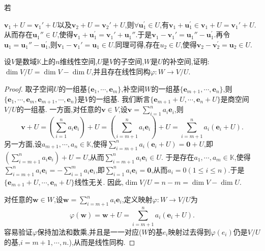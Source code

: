 \documentclass[../../main.tex]{subfiles}%
\begin{document}
\begin{remark}
\hypertarget{remark1陪集}{若}\(\boldsymbol{v}_1 + U=\boldsymbol{v}_1'+U\)以及\(\boldsymbol{v}_2 + U=\boldsymbol{v}_2'+U\),则$\forall \boldsymbol{u}_{1}^{\prime}\in U$,有$\boldsymbol{v}_1+\boldsymbol{u}_{1}^{\prime}\in \boldsymbol{v}_1 + U = \boldsymbol{v}_1' + U$.从而存在$\boldsymbol{u}_{1}''\in U$,使得$\boldsymbol{v}_1+\boldsymbol{u}_{1}^{\prime}=\boldsymbol{v}_1'+\boldsymbol{u}_{1}''$.于是$\boldsymbol{v}_1 - \boldsymbol{v}_1'=\boldsymbol{u}_{1}''-\boldsymbol{u}_{1}^{\prime}$.再令$\boldsymbol{u}_1=\boldsymbol{u}_{1}''-\boldsymbol{u}_{1}^{\prime}$,则$\boldsymbol{v}_1 - \boldsymbol{v}_1'=\boldsymbol{u}_1\in U$.同理可得,存在$u_2\in U$,使得$\boldsymbol{v}_2-\boldsymbol{v}_{2}^{\prime}=\boldsymbol{u}_2\in U$.
\end{remark}


\begin{proposition}[商空间的维数公式和商空间与补空间同构]\label{proposition:商空间的维数公式和商空间与补空间同构}
设\(V\)是数域\(\mathbb{K}\)上的\(n\)维线性空间,\(U\)是\(V\)的子空间,\(W\)是\(U\)的补空间,证明:\(\dim V/U=\dim V-\dim U\),并且存在线性同构\(\varphi:W\to V/U\).
\end{proposition}
\begin{proof}

取子空间\(U\)的一组基\(\{\boldsymbol{e}_1,\cdots,\boldsymbol{e}_m\}\),补空间\(W\)的一组基\(\{\boldsymbol{e}_{m + 1},\cdots,\boldsymbol{e}_n\}\),则\(\{\boldsymbol{e}_1,\cdots,\boldsymbol{e}_m,\boldsymbol{e}_{m + 1},\cdots,\boldsymbol{e}_n\}\)是\(V\)的一组基. 我们断言\(\{\boldsymbol{e}_{m + 1}+U,\cdots,\boldsymbol{e}_n+U\}\)是商空间\(V/U\)的一组基. 一方面,对任意的\(\boldsymbol{v}\in V\),设\(\boldsymbol{v}=\sum_{i = 1}^{n}a_i\boldsymbol{e}_i\),则
\[
\boldsymbol{v}+U=\left(\sum_{i = 1}^{n}a_i\boldsymbol{e}_i\right)+U=\left(\sum_{i = m + 1}^{n}a_i\boldsymbol{e}_i\right)+U=\sum_{i = m + 1}^{n}a_i(\boldsymbol{e}_i+U).
\]
另一方面,设\(a_{m + 1},\cdots,a_n\in\mathbb{K}\),使得\(\sum_{i = m + 1}^{n}a_i(\boldsymbol{e}_i+U)=\boldsymbol{0}+U\),即\(\left(\sum_{i = m + 1}^{n}a_i\boldsymbol{e}_i\right)+U = U\),从而\(\sum_{i = m + 1}^{n}a_i\boldsymbol{e}_i\in U\). 于是存在\(a_1,\cdots,a_m\in\mathbb{K}\),使得\(\sum_{i = m + 1}^{n}a_i\boldsymbol{e}_i=-\sum_{i = 1}^{m}a_i\boldsymbol{e}_i\),即\(\sum_{i = 1}^{n}a_i\boldsymbol{e}_i=\boldsymbol{0}\),从而\(a_i = 0(1\leqslant  i\leqslant  n)\).于是\(\{\boldsymbol{e}_{m + 1}+U,\cdots,\boldsymbol{e}_n+U\}\)线性无关. 因此,\(\dim V/U=n - m=\dim V-\dim U\).

对任意的\(\boldsymbol{w}\in W\),设\(\boldsymbol{w}=\sum_{i = m + 1}^{n}a_i\boldsymbol{e}_i\),定义映射\(\varphi:W\to V/U\)为
\[
\varphi(\boldsymbol{w})=\boldsymbol{w}+U=\sum_{i = m + 1}^{n}a_i(\boldsymbol{e}_i+U).
\]
容易验证\(\varphi\)保持加法和数乘,并且是一一对应($W$的基$e_i$映射过去得到$\varphi(e_i)$仍是$V/U$的基,$i=m+1,\cdots,n$.),从而是线性同构. 

\end{proof}
\end{document}
